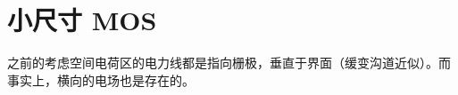 \documentclass[cn,11pt,chinese,black,simple]{../elegantbook}
\begin{document}
\fi 
\def\chapname{06shortmos}

\chapter{小尺寸 MOS} 

之前的考虑空间电荷区的电力线都是指向栅极，垂直于界面（缓变沟道近似）。而事实上，横向的电场也是存在的。

\let\chapname\undefined
\ifx\mainclass\undefined
\end{document}
